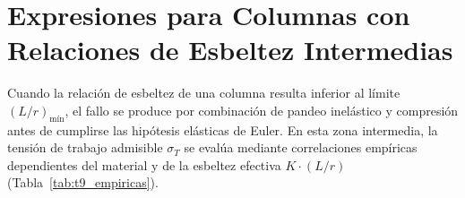 \section{Expresiones para Columnas con Relaciones de Esbeltez Intermedias}

Cuando la relación de esbeltez de una columna resulta inferior al límite $(L/r)_{\text{mín}}$, el fallo se produce por combinación de pandeo inelástico y compresión antes de cumplirse las hipótesis elásticas de Euler. En esta zona intermedia, la tensión de trabajo admisible $\sigma_T$ se evalúa mediante correlaciones empíricas dependientes del material y de la esbeltez efectiva $K\cdot (L/r)$ (Tabla~\ref{tab:t9_empiricas}).

\begin{table}[H]
    \centering
    \caption{Ecuaciones empíricas habituales para columnas con relaciones de esbeltez intermedias ($\sigma_T$ expresada en $\text{kgf/cm}^2$).}
    \label{tab:t9_empiricas}
\end{table}

